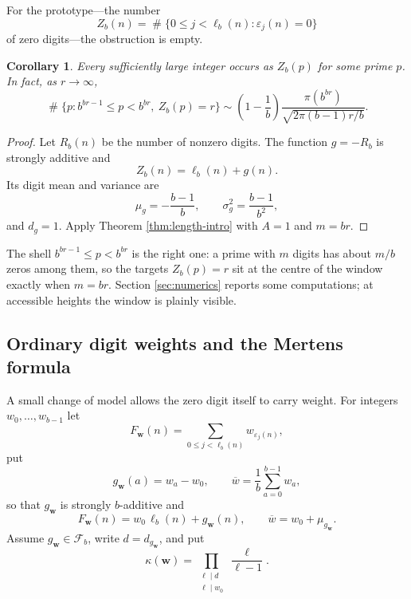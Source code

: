 \documentclass[11pt,reqno]{amsart}
\theoremstyle{plain}
\newtheorem{corollary}[theorem]{Corollary}
\theoremstyle{definition}
\newcommand{\eps}{\varepsilon}
\newcommand{\1}{\mathbf 1}
\newcommand{\ellb}{\ell_b}
\DeclareMathOperator{\Card}{\#}
\begin{document}
For the prototype---the number
\[
 Z_b(n)=\Card\{0\le j<\ellb(n):\eps_j(n)=0\}
\]
of zero digits---the obstruction is empty.

\begin{corollary}\label{cor:zeros-intro}
Every sufficiently large integer occurs as $Z_b(p)$ for some prime $p$.  In fact, as $r\to\infty$,
\[
 \Card\{p:b^{br-1}\le p<b^{br},\ Z_b(p)=r\}
 \sim \left(1-\frac1b\right)
 \frac{\pi(b^{br})}{\sqrt{2\pi (b-1)r/b}}.
\]
\end{corollary}

\begin{proof}
Let $R_b(n)$ be the number of nonzero digits.  The function $g=-R_b$ is strongly additive and
\[
 Z_b(n)=\ellb(n)+g(n).
\]
Its digit mean and variance are
\[
 \mu_g=-\frac{b-1}{b},\qquad \sigma_g^2=\frac{b-1}{b^2},
\]
and $d_g=1$.  Apply Theorem \ref{thm:length-intro} with $A=1$ and $m=br$.
\end{proof}

The shell $b^{br-1}\le p<b^{br}$ is the right one: a prime with $m$ digits has about $m/b$ zeros among them, so the targets $Z_b(p)=r$ sit at the centre of the window exactly when $m=br$.  Section \ref{sec:numerics} reports some computations; at accessible heights the window is plainly visible.

\subsection{Ordinary digit weights and the Mertens formula}

A small change of model allows the zero digit itself to carry weight.  For integers $w_0,\ldots,w_{b-1}$ let
\begin{equation}\label{eq:ordinary-weight}
 F_{\mathbf w}(n)=\sum_{0\le j<\ellb(n)}w_{\eps_j(n)},
\end{equation}
put
\[
 g_{\mathbf w}(a)=w_a-w_0,\qquad
 \overline w=\frac1b\sum_{a=0}^{b-1}w_a,
\]
so that $g_{\mathbf w}$ is strongly $b$-additive and
\begin{equation}\label{eq:length-decomp}
 F_{\mathbf w}(n)=w_0\,\ellb(n)+g_{\mathbf w}(n),
 \qquad
 \overline w=w_0+\mu_{g_{\mathbf w}}.
\end{equation}
Assume $g_{\mathbf w}\in\mathcal F_b$, write $d=d_{g_{\mathbf w}}$, and put
\begin{equation}\label{eq:kappa-w}
 \kappa(\mathbf w)=\prod_{\substack{\ell\mid d\\ \ell\mid w_0}}\frac{\ell}{\ell-1}.
\end{equation}
\end{document}

